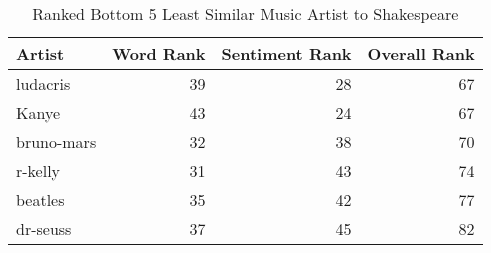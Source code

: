 \begin{table}[ht]
\centering
\begin{tabular}{lrrr}
  \hline
Artist & Word Rank & Sentiment Rank & Overall Rank \\ 
  \hline
ludacris &  39 &  28 &  67 \\ 
  Kanye &  43 &  24 &  67 \\ 
  bruno-mars &  32 &  38 &  70 \\ 
  r-kelly &  31 &  43 &  74 \\ 
  beatles &  35 &  42 &  77 \\ 
  dr-seuss &  37 &  45 &  82 \\ 
   \hline
\end{tabular}
\caption{Ranked Bottom 5 Least Similar Music Artist to Shakespeare} 
\label{tab:bottom5_ranktable}
\end{table}

